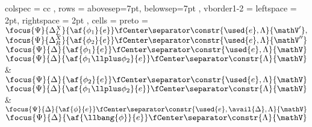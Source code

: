 \begin{tblr}{ colspec = { cc } 
	    , rows = {abovesep=7pt, belowsep=7pt}
	    , vborder{1-2} = { leftspace = 2pt, rightspace = 2pt } 
	    , cells = { preto = {\footnotesize} }
	    }
	\AX$\focus{\Psi}{\Delta_L^X}{\af{\phi_1}{e}} \fCenter \separator \constr{\used{e}, \Lambda}{\mathV'},$
	\noLine
	\UI$\focus{\Psi}{\Delta_R^X}{\af{\phi_2}{e}} \fCenter \separator \constr{\used{e}, \Lambda}{\mathV''}$
	\LeftLabel{\derRule{\displayten}}
	\DP
	\\ 
	\AX$\focus{\Psi}{\Delta}{\af{\phi_1}{e}} \fCenter \separator \constr{\used{e}, \Lambda}{\mathV}$
	\LeftLabel{\derRule{\displayplus[L]}}
	\UI$\focus{\Psi}{\Delta}{\af{\phi_1 \llplus \phi_2}{e}} \fCenter \separator \constr{\Lambda}{\mathV}$
	\DP
	&
	\AX$\focus{\Psi}{\Delta}{\af{\phi_2}{e}} \fCenter \separator \constr{\used{e}, \Lambda}{\mathV}$
	\LeftLabel{\derRule{\displayplus[R]}}
	\UI$\focus{\Psi}{\Delta}{\af{\phi_1 \llplus \phi_2}{e}} \fCenter \separator \constr{\Lambda}{\mathV}$
	\DP
	\\
	\LeftLabel{\derRule{\displayone}}
	\DP
	&
	\AX$\focus{\Psi}{\Delta}{\af{\phi}{e}} \fCenter \separator \constr{\used{e}, \avail{\Delta}, \Lambda }{\mathV}$
	\LeftLabel{\derRule{\displaybang}}
	\UI$\focus{\Psi}{\Delta}{\af{\llbang{\phi}}{e}} \fCenter \separator \constr{\Lambda}{\mathV}$
	\DP
	\\
	\LeftLabel{\derRule{\displaytoasy}}
	\DP
\end{tblr}
